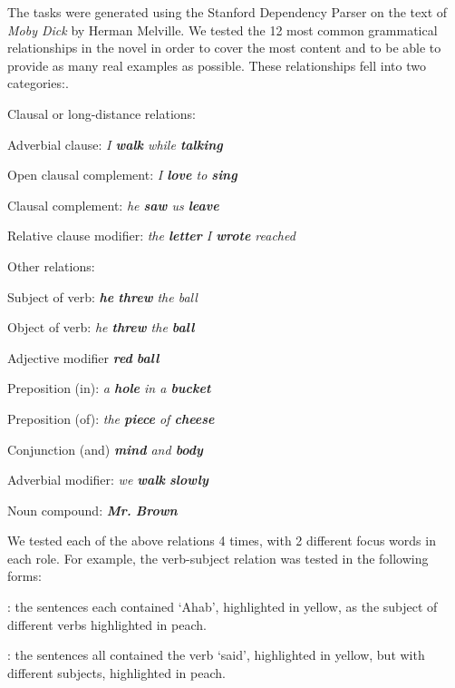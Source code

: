The tasks were generated using the Stanford Dependency Parser \cite{de2006generating} on the text of \emph{Moby Dick} by Herman Melville. We tested the 12 most common grammatical relationships in the novel in order to cover the most content and to be able to provide as many real examples as possible. These relationships fell into two categories:.


Clausal or long-distance relations:
	\squishlist
		\item {} Adverbial clause: \emph{ I \textbf{walk} while \textbf{talking}}
		\item  {} Open clausal complement:  \emph{I \textbf{love} to \textbf{sing} }
		\item  {} Clausal complement:  \emph{ he \textbf{saw} us \textbf{leave}}
		\item  {} Relative clause modifier:  \emph{the \textbf{letter} I \textbf{wrote} reached }
	\squishend

Other relations:
		\squishlist
			\item {} Subject of verb: \emph{\textbf{he} \textbf{threw} the ball}
			\item {} Object of verb:  \emph{ he \textbf{threw} the \textbf{ball}}
			\item {} Adjective modifier \emph{\textbf{red} \textbf{ball}}
			\item {}  Preposition (in): \emph{a \textbf{hole} in a \textbf{bucket}}
			\item {}	Preposition (of):  \emph{ the \textbf{piece} of \textbf{cheese}}
			\item {}  Conjunction (and)  \emph{ \textbf{mind} and \textbf{body}}
		\item{} Adverbial modifier: \emph{  we \textbf{walk} \textbf{slowly}}
		\item {} Noun compound:  \emph{ \textbf{Mr.}  \textbf{Brown}}
	\squishend

We tested each of the above relations 4 times, with 2 different focus words in each role. For example, the verb-subject relation  was tested in the following forms:
\squishlist
	\item {}:  the sentences each contained `Ahab', highlighted in yellow, as the subject of different verbs highlighted in peach.
	\item {}

	\item {}: the sentences all contained the verb `said', highlighted in yellow, but with different subjects, highlighted in peach.
	\item {}
\squishend


